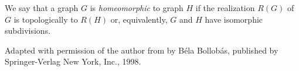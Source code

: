 \documentclass[12pt]{article}
\begin{document}
We say that a graph $G$ is \emph{homeomorphic} to graph $H$ if the
  realization $R(G)$ of $G$ is topologically  to $R(H)$ or, equivalently, $G$ and $H$ have isomorphic subdivisions.


\footnotesize{Adapted with permission of the author from \emph{} by B\'{e}la Bollob\'{a}s, published by Springer-Verlag New York, Inc., 1998.}
\end{document}
